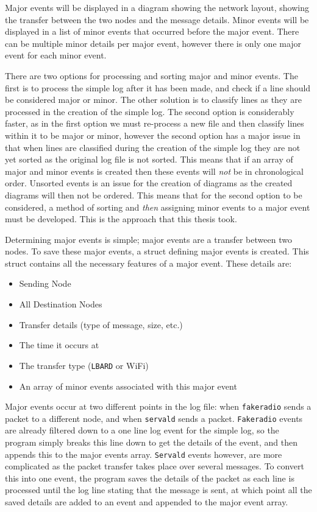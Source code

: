 Major events will be displayed in a diagram showing the network layout, showing the transfer between the two nodes and the message details. 
Minor events will be displayed in a list of minor events that occurred before the major event.
There can be multiple minor details per major event, however there is only one major event for each minor event.

There are two options for processing and sorting major and minor events.
The first is to process the simple log after it has been made, and check if a line should be considered major or minor. 
The other solution is to classify lines as they are processed in the creation of the simple log.
The second option is considerably faster, as in the first option we must re-process a new file and then classify lines within it to be major or minor, however the second option has a major issue in that when lines are classified during the creation of the simple log they are not yet sorted as the original log file is not sorted.
This means that if an array of major and minor events is created then these events will \emph{not} be in chronological order.
Unsorted events is an issue for the creation of diagrams as the created diagrams will then not be ordered.
This means that for the second option to be considered, a method of sorting and \emph{then} assigning minor events to a major event must be developed.
This is the approach that this thesis took.

Determining major events is simple; major events are a transfer between two nodes.
To save these major events, a struct defining major events is created.
This struct contains all the necessary features of a major event. These details are:
\begin{itemize}
    \item Sending Node
    \item All Destination Nodes
    \item Transfer details (type of message, size, etc.)
    \item The time it occurs at
    \item The transfer type (\texttt{LBARD} or WiFi)
    \item An array of minor events associated with this major event
\end{itemize}
Major events occur at two different points in the log file: when \texttt{fakeradio} sends a packet to a different node, and when \texttt{servald} sends a packet.
\texttt{Fakeradio} events are already filtered down to a one line log event for the simple log, so the program simply breaks this line down to get the details of the event, and then appends this to the major events array.
\texttt{Servald} events however, are more complicated as the packet transfer takes place over several messages.
To convert this into one event, the program saves the details of the packet as each line is processed until the log line stating that the message is sent, at which point all the saved details are added to an event and appended to the major event array.

